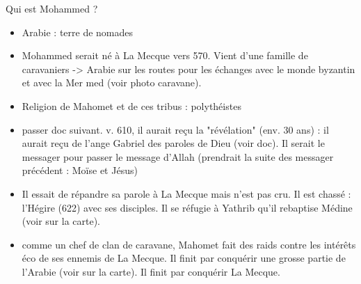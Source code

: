 \documentclass{beamer}
\begin{document}
\begin{frame}{Qui est Mohammed ?}


\begin{itemize}
\item Arabie : terre de nomades
\item Mohammed serait né à La Mecque vers 570. Vient d'une famille de caravaniers -> Arabie sur les routes pour les échanges avec le monde byzantin et avec la Mer med (voir photo caravane).
\item Religion de Mahomet et de ces tribus : polythéistes
\item passer doc suivant. v. 610, il aurait reçu la "révélation" (env. 30 ans) : il aurait reçu de l'ange Gabriel des paroles de Dieu (voir doc). Il serait le messager pour passer le message d'Allah (prendrait la suite des messager précédent : Moïse et Jésus)
\item Il essait de répandre sa parole à La Mecque mais n'est pas cru. Il est chassé : l'Hégire (622) avec ses disciples. Il se réfugie à Yathrib qu'il rebaptise Médine (voir sur la carte).
\end{itemize}
\end{frame}

\begin{frame}

\begin{itemize}

\item comme un chef de clan de caravane, Mahomet fait des raids contre les intérêts éco de ses ennemis de La Mecque. Il finit par conquérir une grosse partie de l'Arabie (voir sur la carte). Il finit par conquérir La Mecque.
\end{itemize}

\vfill


\vfill




\end{frame}
\end{document}
